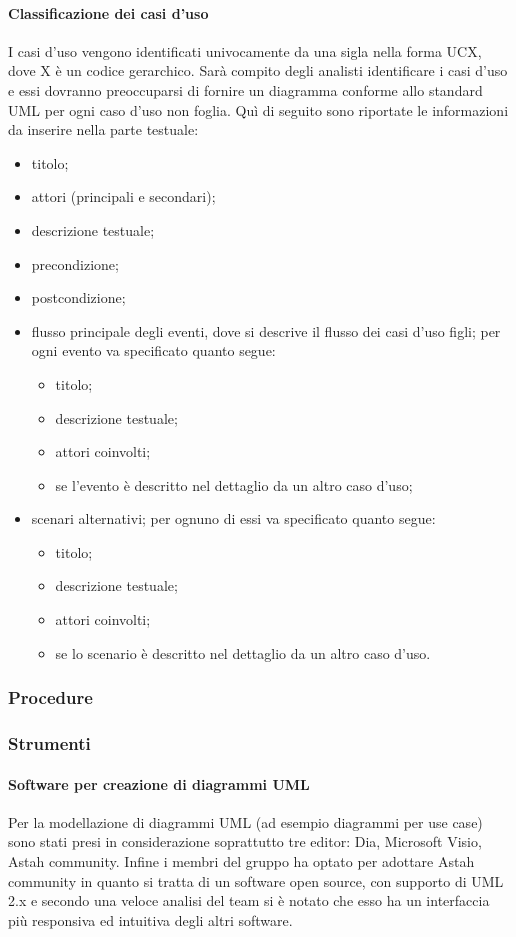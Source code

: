 			\paragraph{Classificazione dei casi d'uso}
				I casi d'uso vengono identificati univocamente da una sigla nella forma UCX, dove X è un codice gerarchico. Sarà compito degli analisti identificare i casi d'uso e essi dovranno preoccuparsi di fornire un diagramma conforme allo standard UML per ogni caso d'uso non foglia. Quì di seguito sono riportate le informazioni da inserire nella parte testuale:
				\begin{itemize}
					\item titolo;
					\item attori (principali e secondari);
					\item descrizione testuale;
					\item precondizione;
					\item postcondizione;
					\item flusso principale degli eventi, dove si descrive il flusso dei casi d'uso figli; per ogni evento va specificato quanto segue:
					\begin{itemize}
						\item titolo;
						\item descrizione testuale;
						\item attori coinvolti;
						\item se l’evento è descritto nel dettaglio da un altro caso d’uso;
					\end{itemize}
					\item scenari alternativi; per ognuno di essi va specificato quanto segue:
					\begin{itemize}
						\item titolo;
						\item descrizione testuale;
						\item attori coinvolti;
						\item se lo scenario è descritto nel dettaglio da un altro caso d’uso.
					\end{itemize}
				\end{itemize}
		\subsubsection{Procedure}
		\subsubsection{Strumenti}
			\paragraph{Software per creazione di diagrammi UML}
			Per la modellazione di diagrammi UML (ad esempio diagrammi per use case) sono stati presi in considerazione soprattutto tre editor: Dia, Microsoft Visio, Astah community. Infine i membri del gruppo \groupname{} ha optato per adottare Astah community in quanto si tratta di un software open source, con supporto di UML 2.x e secondo una veloce analisi del team si è notato che esso ha un interfaccia più responsiva ed intuitiva degli altri software.
